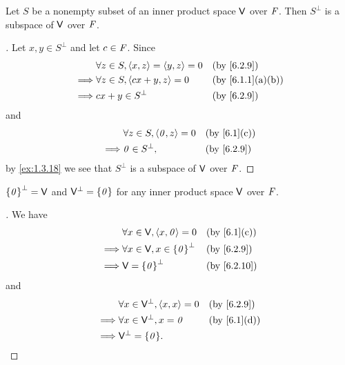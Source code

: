 \begin{prop}\label{6.2.10}
  Let \(S\) be a nonempty subset of an inner product space \(\mathsf{V}\) over \(\mathit{F}\).
  Then \(S^{\perp}\) is a subspace of \(\mathsf{V}\) over \(\mathit{F}\).
\end{prop}

\begin{proof}[]
  Let \(x, y \in S^{\perp}\) and let \(c \in \mathit{F}\).
  Since
  \begin{align*}
             & \forall z \in S, \inn{x, z} = \inn{y, z} = 0 &  & \text{(by \cref{6.2.9})}       \\
    \implies & \forall z \in S, \inn{cx + y, z} = 0         &  & \text{(by \cref{6.1.1}(a)(b))} \\
    \implies & cx + y \in S^{\perp}                         &  & \text{(by \cref{6.2.9})}
  \end{align*}
  and
  \begin{align*}
             & \forall z \in S, \inn{\zv, z} = 0 &  & \text{(by \cref{6.1}(c))} \\
    \implies & \zv \in S^{\perp},                &  & \text{(by \cref{6.2.9})}
  \end{align*}
  by \cref{ex:1.3.18} we see that \(S^{\perp}\) is a subspace of \(\mathsf{V}\) over \(\mathit{F}\).
\end{proof}

\begin{eg}\label{6.2.11}
  \(\left\lbrace\mathit{0}\right\rbrace^{\perp} = \mathsf{V}\) and \(\mathsf{V}^{\perp} = \left\lbrace\mathit{0}\right\rbrace\) for any inner product space \(\mathsf{V}\) over \(\mathit{F}\).
\end{eg}

\begin{proof}[]
  We have
  \begin{align*}
             & \forall x \in \V, \inn{x, \zv} = 0        &  & \text{(by \cref{6.1}(c))} \\
    \implies & \forall x \in \V, x \in \set{\zv}^{\perp} &  & \text{(by \cref{6.2.9})}  \\
    \implies & \V = \set{\zv}^{\perp}                    &  & \text{(by \cref{6.2.10})}
  \end{align*}
  and
  \begin{align*}
             & \forall x \in \V^{\perp}, \inn{x, x} = 0 &  & \text{(by \cref{6.2.9})}  \\
    \implies & \forall x \in \V^{\perp}, x = \zv        &  & \text{(by \cref{6.1}(d))} \\
    \implies & \V^{\perp} = \set{\zv}.
  \end{align*}
\end{proof}


